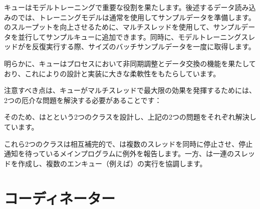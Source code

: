 \begin{content}
キューはモデルトレーニングで重要な役割を果たします。後述するデータ読み込みのでは、トレーニングモデルは通常を使用してサンプルデータを準備します。のスループットを向上させるために、マルチスレッドを使用して、サンプルデータを並行してサンプルキューに追加できます。同時に、モデルトレーニングスレッドがを反復実行する際、サイズのバッチサンプルデータを一度に取得します。

明らかに、キューはプロセスにおいて非同期調整とデータ交換の機能を果たしており、これによりの設計と実装に大きな柔軟性をもたらしています。

注意すべき点は、キューがマルチスレッドで最大限の効果を発揮するためには、2つの厄介な問題を解決する必要があることです：

\begin{enum}
\end{enum}

そのため、はとという2つのクラスを設計し、上記の2つの問題をそれぞれ解決しています。

これら2つのクラスは相互補完的で、は複数のスレッドを同時に停止させ、停止通知を待っているメインプログラムに例外を報告します。一方、は一連のスレッドを作成し、複数のエンキュー（例えば）の実行を協調します。

\end{content}

\section{コーディネーター}

